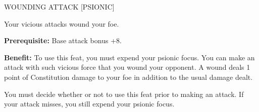 \documentclass{article}
\begin{document}
\vspace{12pt}
WOUNDING ATTACK [PSIONIC]

Your vicious attacks wound your foe.

\textbf{Prerequisite:} Base attack bonus +8.

\textbf{Benefit:} To use this feat, you must expend your psionic focus. You can 
make an attack with such vicious force that you wound your opponent. A wound deals 
1 point of Constitution damage to your foe in addition to the usual damage dealt.

You must decide whether or not to use this feat prior to making an attack. If your 
attack misses, you still expend your psionic focus.

\newpage
\end{document}

